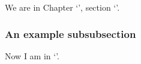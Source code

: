 \begin{ExampleBlock}{}
We are in Chapter `', section `'.

\subsubsection{An example subsubsection}

    Now I am in `'.





\end{ExampleBlock}
